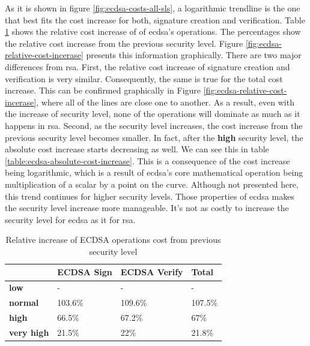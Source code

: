 \documentclass{llncs}
\begin{document}
As it is shown in figure \ref{fig:ecdsa-costs-all-sls}, a logarithmic trendline is the one that best fits the cost increase for both,
signature creation and verification.
Table \ref{table:ecdsa-relative-cost-increase} shows the relative cost increase of of \gls{ecdsa}'s operations. The percentages
show the relative cost increase from the previous security level. Figure \ref{fig:ecdsa-relative-cost-incerase} presents this information
graphically. There are two major differences from \gls{rsa}. First, the relative cost increase
of signature creation and verification is very similar. Consequently, the same is true for the total cost increase. This can be confirmed
graphically in Figure \ref{fig:ecdsa-relative-cost-incerase}, where all of the lines are
close one to another. As a result, even with the increase of security level, none of the operations will dominate as much as it happens
in \gls{rsa}. Second, as the security level increases, the cost increase from the previous security level becomes smaller. In fact, after the
\textbf{high} security level, the absolute cost increase starts decreasing as well. We can see this in table \ref{table:ecdsa-absolute-cost-increase}.
This is a consequence of the cost increase being logarithmic, which is a result of \gls{ecdsa}'s core mathematical operation being
multiplication of a scalar by a point on the curve. Although not presented here, this trend continues for higher security levels.
Those properties of \gls{ecdsa} makes the security level increase more manageable. It's not as costly to increase the security level for
\gls{ecdsa} as it for \gls{rsa}.

\begin{table}[]
  \begin{tabular}{|l|l|l|l|}
    \hline
  & \textbf{ECDSA Sign} & \textbf{ECDSA Verify} & \textbf{Total} \\ \hline
  \textbf{low}       & -                 & -                   & -              \\ \hline
  \textbf{normal}    & 103.6\%           & 109.6\%             & 107.5\%        \\ \hline
  \textbf{high}      & 66.5\%            & 67.2\%              & 67\%           \\ \hline
  \textbf{very high} & 21.5\%            & 22\%                & 21.8\%         \\ \hline
  \end{tabular}
  \centering \caption{\label{table:ecdsa-relative-cost-increase} Relative increase of ECDSA operations cost from previous security level}
  \end{table}
\end{document}
